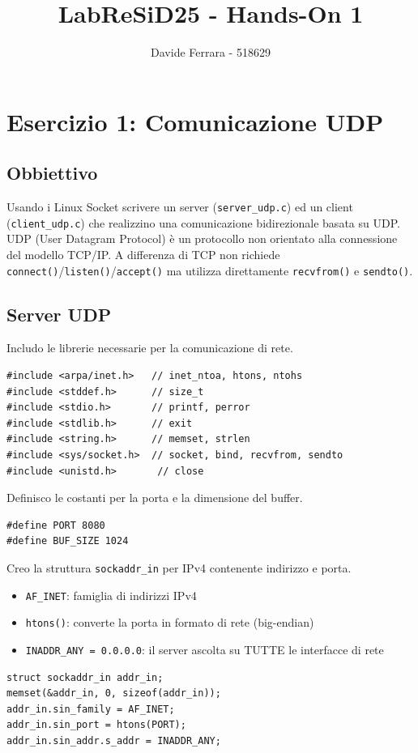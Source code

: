 \documentclass[a4paper,12pt]{article}
\title{LabReSiD25 - Hands-On 1}
\author{Davide Ferrara - 518629}
\date{}
\begin{document}
\maketitle

\section{Esercizio 1: Comunicazione UDP}

\subsection{Obbiettivo}
Usando i Linux Socket scrivere un server (\texttt{server\_udp.c}) ed un client
(\texttt{client\_udp.c}) che realizzino una comunicazione bidirezionale 
basata su UDP.
\newline
UDP (User Datagram Protocol) è un protocollo non orientato alla
connessione del modello TCP/IP. A differenza di TCP non richiede
\texttt{connect()}/\texttt{listen()}/\texttt{accept()} ma utilizza direttamente
\texttt{recvfrom()} e \texttt{sendto()}.

\subsection{Server UDP}

Includo le librerie necessarie per la comunicazione di rete.
\begin{lstlisting}[caption={server\_udp.c - Include}]
#include <arpa/inet.h>   // inet_ntoa, htons, ntohs
#include <stddef.h>      // size_t
#include <stdio.h>       // printf, perror
#include <stdlib.h>      // exit
#include <string.h>      // memset, strlen
#include <sys/socket.h>  // socket, bind, recvfrom, sendto
#include <unistd.h>       // close
\end{lstlisting}
\FloatBarrier

Definisco le costanti per la porta e la dimensione del buffer.
\begin{lstlisting}[caption={server\_udp.c - Costanti}]
#define PORT 8080
#define BUF_SIZE 1024
\end{lstlisting}
\FloatBarrier

Creo la struttura \texttt{sockaddr\_in} per IPv4 contenente indirizzo e porta.
\begin{itemize}
    \item \texttt{AF\_INET}: famiglia di indirizzi IPv4
    \item \texttt{htons()}: converte la porta in formato di rete (big-endian)
    \item \texttt{INADDR\_ANY = 0.0.0.0}: il server ascolta su TUTTE le interfacce di rete
\end{itemize}
\begin{lstlisting}[caption={server\_udp.c - sockaddr\_in}]
struct sockaddr_in addr_in;
memset(&addr_in, 0, sizeof(addr_in));
addr_in.sin_family = AF_INET;
addr_in.sin_port = htons(PORT);
addr_in.sin_addr.s_addr = INADDR_ANY;
\end{lstlisting}
\FloatBarrier
\end{document}
